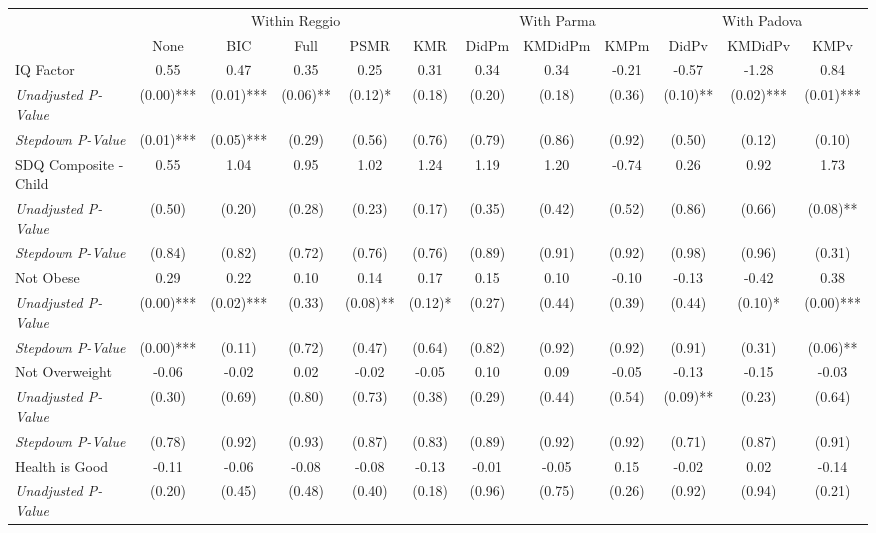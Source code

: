 \begin{tabular}{l c c c c c c c c c c c}
\toprule
& \multicolumn{5}{c}{Within Reggio} & \multicolumn{3}{c}{With Parma} & \multicolumn{3}{c}{With Padova} \\\cmidrule(lr){2-6} \cmidrule(lr){7-9} \cmidrule(lr){10-12}
 & None & BIC & Full & PSMR & KMR & DidPm & KMDidPm & KMPm & DidPv & KMDidPv & KMPv \\
\midrule
IQ Factor & 0.55 & 0.47 & 0.35 & 0.25 & 0.31 & 0.34 & 0.34 & -0.21 & -0.57 & -1.28 & 0.84 \\
\quad \textit{Unadjusted P-Value} & (0.00)*** & (0.01)*** & (0.06)** & (0.12)* & (0.18) & (0.20) & (0.18) & (0.36) & (0.10)** & (0.02)*** & (0.01)*** \\
\quad \textit{Stepdown P-Value} & (0.01)*** & (0.05)*** & (0.29) & (0.56) & (0.76) & (0.79) & (0.86) & (0.92) & (0.50) & (0.12) & (0.10) \\
SDQ Composite - Child & 0.55 & 1.04 & 0.95 & 1.02 & 1.24 & 1.19 & 1.20 & -0.74 & 0.26 & 0.92 & 1.73 \\
\quad \textit{Unadjusted P-Value} & (0.50) & (0.20) & (0.28) & (0.23) & (0.17) & (0.35) & (0.42) & (0.52) & (0.86) & (0.66) & (0.08)** \\
\quad \textit{Stepdown P-Value} & (0.84) & (0.82) & (0.72) & (0.76) & (0.76) & (0.89) & (0.91) & (0.92) & (0.98) & (0.96) & (0.31) \\
Not Obese & 0.29 & 0.22 & 0.10 & 0.14 & 0.17 & 0.15 & 0.10 & -0.10 & -0.13 & -0.42 & 0.38 \\
\quad \textit{Unadjusted P-Value} & (0.00)*** & (0.02)*** & (0.33) & (0.08)** & (0.12)* & (0.27) & (0.44) & (0.39) & (0.44) & (0.10)* & (0.00)*** \\
\quad \textit{Stepdown P-Value} & (0.00)*** & (0.11) & (0.72) & (0.47) & (0.64) & (0.82) & (0.92) & (0.92) & (0.91) & (0.31) & (0.06)** \\
Not Overweight & -0.06 & -0.02 & 0.02 & -0.02 & -0.05 & 0.10 & 0.09 & -0.05 & -0.13 & -0.15 & -0.03 \\
\quad \textit{Unadjusted P-Value} & (0.30) & (0.69) & (0.80) & (0.73) & (0.38) & (0.29) & (0.44) & (0.54) & (0.09)** & (0.23) & (0.64) \\
\quad \textit{Stepdown P-Value} & (0.78) & (0.92) & (0.93) & (0.87) & (0.83) & (0.89) & (0.92) & (0.92) & (0.71) & (0.87) & (0.91) \\
Health is Good & -0.11 & -0.06 & -0.08 & -0.08 & -0.13 & -0.01 & -0.05 & 0.15 & -0.02 & 0.02 & -0.14 \\
\quad \textit{Unadjusted P-Value} & (0.20) & (0.45) & (0.48) & (0.40) & (0.18) & (0.96) & (0.75) & (0.26) & (0.92) & (0.94) & (0.21) \\

\end{tabular}
